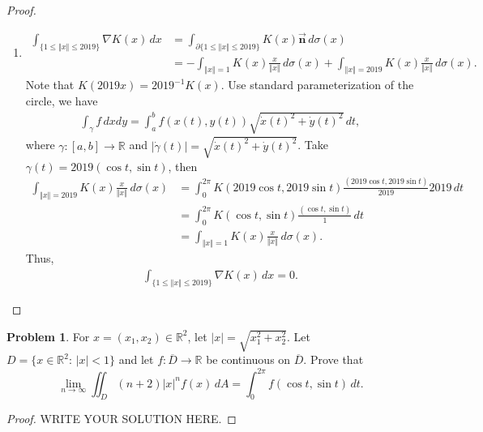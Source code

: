 \documentclass[11pt]{article}
\theoremstyle{definition}
\newtheorem{problem}{Problem}
\theoremstyle{definition}
\begin{document}
\begin{proof}
\begin{enumerate}[label=(\alph*)]
    \item 
    \begin{align*}
        \int_{\{1\leq \Vert x\Vert\leq 2019\}} \nabla K(x)\, dx & = \int_{\partial \{1\leq \Vert x\Vert\leq 2019\}} K(x)\vec{\mathbf{n}}\, d\sigma(x) \\
        & = - \int_{\Vert x\Vert = 1} K(x) \frac{x}{\Vert x\Vert}\, d\sigma(x) + \int_{\Vert x\Vert = 2019} K(x) \frac{x}{\Vert x\Vert}\, d\sigma(x).
    \end{align*}
    Note that $K(2019 x) = 2019^{-1} K(x)$. Use standard parameterization of the circle, we have
    \begin{align*}
        \int_{\gamma} f\, dx dy = \int^b_a f(x(t), y(t)) \sqrt{\Dot{x}(t)^2 + \Dot{y}(t)^2} \, dt,
    \end{align*}
    where $\gamma: [a,b] \to \mathbb{R}$ and $|\Dot{\gamma}(t)| = \sqrt{\Dot{x}(t)^2 + \Dot{y}(t)^2}$. Take $\gamma(t) = 2019 (\cos t, \sin t)$, then 
    \begin{align*}
        \int_{\Vert x\Vert = 2019} K(x) \frac{x}{\Vert x\Vert}\, d\sigma(x) & = \int^{2\pi}_0 K(2019 \cos t, 2019 \sin t) \frac{(2019 \cos t, 2019 \sin t)}{2019} 2019 \, dt \\
        & = \int^{2\pi}_0 K(\cos t, \sin t) \frac{(\cos t, \sin t)}{1} \, dt \\
        & = \int_{\Vert x\Vert = 1} K(x) \frac{x}{\Vert x\Vert}\, d\sigma(x).
    \end{align*}
    Thus, 
    \begin{align*}
        \int_{\{1\leq \Vert x\Vert\leq 2019\}} \nabla K(x)\, dx = 0.
    \end{align*}
\end{enumerate}
\end{proof}


\medskip


\begin{problem}
For $x = (x_1,x_2)\in\mathbb{R}^2$, let $|x| = \sqrt{x_1^2+x_2^2}$. Let $D = \{x\in\mathbb{R}^2:\, |x|< 1\}$ and let $f:\overline{D}\to\mathbb{R}$ be continuous on $\overline{D}$. Prove that
$$
\lim_{n\to\infty} \iint_D (n+2)|x|^n f(x)\, dA=\int_0^{2\pi} f(\cos t,\sin t)\, dt.
$$
\end{problem}
\begin{proof}
	WRITE YOUR SOLUTION HERE.
\end{proof}

\newpage


\end{document}
